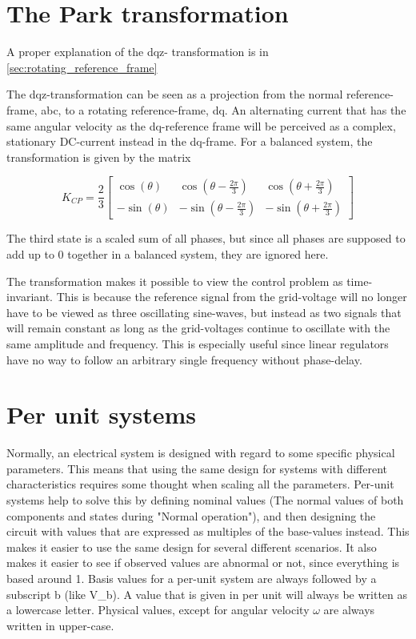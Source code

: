 \section{The Park transformation}

A proper explanation of the dqz- transformation is in \cref{sec:rotating_reference_frame}

The dqz-transformation can be seen as a projection from the normal reference-frame, abc, to a rotating reference-frame, dq. An alternating current that has the same angular velocity as the dq-reference frame will be perceived as a complex, stationary DC-current instead in the dq-frame. For a balanced system, the transformation is given by the matrix

\begin{equation}
 K_{CP} = 
 \frac{2}{3}\begin{bmatrix}
 \cos{\left(\theta\right)}
 & \cos{\left(\theta - \frac{2\pi}{3}\right)}
 & \cos{\left(\theta + \frac{2\pi}{3}\right)} \\
 -\sin{\left(\theta\right)}
 & -\sin{\left(\theta - \frac{2\pi}{3}\right)}
 & -\sin{\left(\theta + \frac{2\pi}{3}\right)} 
\end{bmatrix}
\end{equation}{}

The third state is a scaled sum of all phases, but since all phases are supposed to add up to 0 together in a balanced system, they are ignored here. 

\noindent
The transformation makes it possible to view the control problem as time-invariant. This is because the reference signal from the grid-voltage will no longer have to be viewed as three oscillating sine-waves, but instead as two signals that will remain constant as long as the grid-voltages continue to oscillate with the same amplitude and frequency. This is especially useful since linear regulators have no way to follow an arbitrary single frequency without phase-delay.

\section{Per unit systems}
Normally, an electrical system is designed with regard to some specific physical parameters. This means that using the same design for systems with different characteristics requires some thought when scaling all the parameters. 
Per-unit systems help to solve this by defining nominal values (The normal values of both components and states during "Normal operation"), and then designing the circuit with values that are expressed as multiples of the base-values instead. This makes it easier to use the same design for several different scenarios. It also makes it easier to see if observed values are abnormal or not, since everything is based around 1. Basis values for a per-unit system are always followed by a subscript b (like V\gls{_b}). A value that is given in per unit will always be written as a lowercase letter. Physical values, except for angular velocity $\omega$ are always written in upper-case. 


